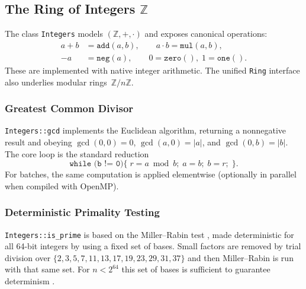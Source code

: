\subsection{The Ring of Integers \texorpdfstring{$\mathbb{Z}$}{Z}}

The class \texttt{Integers} models $(\mathbb{Z}, +, \cdot)$ and exposes
canonical operations:
\[
\begin{aligned}
a + b &= \texttt{add}(a,b), \qquad
a \cdot b = \texttt{mul}(a,b), \\
-a &= \texttt{neg}(a), \qquad
0 = \texttt{zero}(), \; 1 = \texttt{one}().
\end{aligned}
\]
These are implemented with native integer arithmetic. The unified \texttt{Ring}
interface also underlies modular rings~$\mathbb{Z}/n\mathbb{Z}$.

\subsubsection*{Greatest Common Divisor}

\texttt{Integers::gcd} implements the Euclidean algorithm, returning a
nonnegative result and obeying
$\gcd(0,0)=0$, $\gcd(a,0)=|a|$, and $\gcd(0,b)=|b|$.
The core loop is the standard reduction
\[
\texttt{while (b != 0)} \{ \; r = a \bmod b;\; a = b;\; b = r; \;\}.
\]
For batches, the same computation is applied elementwise (optionally in
parallel when compiled with OpenMP).

\subsubsection*{Deterministic Primality Testing}

\texttt{Integers::is\_prime} is based on the Miller–Rabin test
\cite{miller1976rabin}, made deterministic for all 64-bit integers by using a
fixed set of bases. Small factors are removed by trial division over
$\{2,3,5,7,11,13,17,19,23,29,31,37\}$ and then Miller–Rabin is run with that
same set. For $n < 2^{64}$ this set of bases is sufficient to guarantee
determinism \cite{jaeschke1993miller, sorenson2015strong}.

